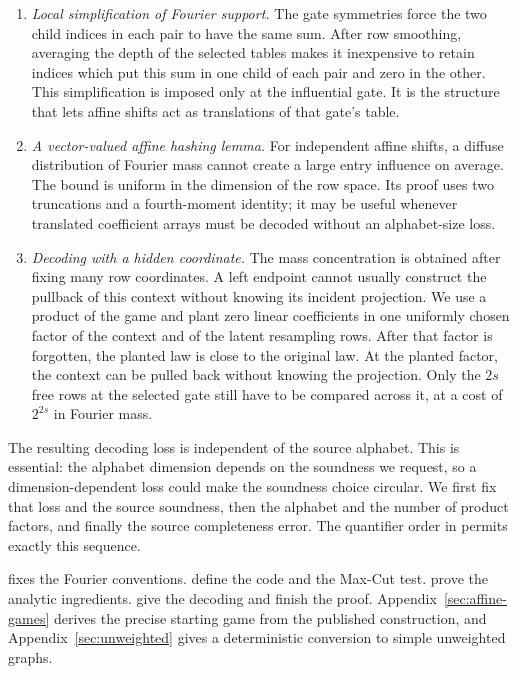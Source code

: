 \begin{enumerate}
\item \emph{Local simplification of Fourier support.}
The gate symmetries force the two child indices in each pair to have the
same sum. After row smoothing, averaging the depth of the selected tables
makes it inexpensive to retain indices which put this sum in one child of
each pair and zero in the other. This simplification is imposed only at
the influential gate. It is the structure that lets affine shifts act as
translations of that gate's table.

\item \emph{A vector-valued affine hashing lemma.}
For independent affine shifts, a diffuse distribution of Fourier mass
cannot create a large entry influence on average. The bound is uniform in
the dimension of the row space. Its proof uses two truncations and a
fourth-moment identity; it may be useful whenever translated coefficient
arrays must be decoded without an alphabet-size loss.

\item \emph{Decoding with a hidden coordinate.}
The mass concentration is obtained after fixing many row coordinates.
A left endpoint cannot usually construct the pullback of this context
without knowing its incident projection. We use a product of the game
and plant zero linear coefficients in one uniformly chosen factor of
the context and of the latent resampling rows. After that factor is
forgotten, the planted law is close to the original law. At the planted
factor, the context can be pulled back without knowing the projection.
Only the $2s$ free rows at the selected gate still have to be compared
across it, at a cost of $2^{2s}$ in Fourier mass.
\end{enumerate}

The resulting decoding loss is independent of the source alphabet.
This is essential: the alphabet dimension depends on the soundness we
request, so a dimension-dependent loss could make the soundness choice
circular. We first fix that loss and the source soundness, then the
alphabet and the number of product factors, and finally the source
completeness error. The quantifier order in
 permits exactly this sequence.

 fixes the Fourier conventions.
 define the code and the Max-Cut test.
 prove the analytic ingredients.
 give the decoding and finish the proof.
Appendix~\ref{sec:affine-games} derives the precise starting game from the
published construction, and Appendix~\ref{sec:unweighted} gives a deterministic
conversion to simple unweighted graphs.

